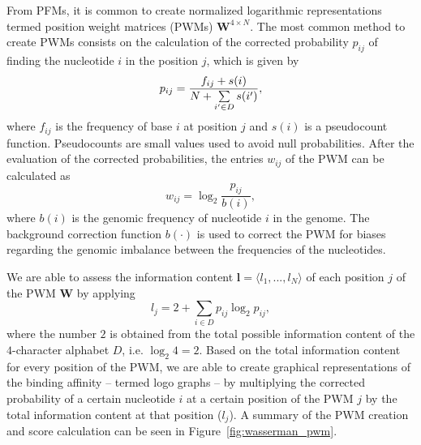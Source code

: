 From PFMs, it is common to create normalized logarithmic representations termed position weight matrices (PWMs) $\mathbf{W}^{4 \times N}$. The most common method to create PWMs consists on the calculation of the corrected probability $ p_{ij} $ of finding the nucleotide $ i $ in the position $ j $, which is given by
\begin{equation}
  \label{eq:pwm1}
  p_{ij} = \frac{ f_{ij} + s(i) }{ N + {\sum\limits _{i^\prime \in D}{ \hspace{-0.0cm} s(i^\prime)}} }, 
\end{equation}
where $ f_{ij} $ is the frequency of base $ i $ at position $ j $ and $ s(i) $ is a pseudocount function. Pseudocounts are small values used to avoid null probabilities. After the evaluation of the corrected probabilities, the entries $ w_{ij} $ of the PWM can be calculated as
\begin{equation}
  \label{eq:pwm2}
  w_{ij} = \log_2 \frac{ p_{ij} }{ b(i) }, 
\end{equation}
where $ b(i) $ is the genomic frequency of nucleotide $ i $ in the genome. The background correction function $b(\cdot)$ is used to correct the PWM for biases regarding the genomic imbalance between the frequencies of the nucleotides.

We are able to assess the information content $ \mathbf{l} = \langle{l}_{1}, ..., {l}_{N}\rangle $ of each position $ j $ of the PWM $ \mathbf{W} $ by applying
\begin{equation}
  \label{eq:pwm.ic}
  {l}_{j} = 2 + \sum\limits _{i \in D} p_{ij} \log_{2} p_{ij},
\end{equation}
where the number $2$ is obtained from the total possible information content of the $4$-character alphabet $D$, i.e. $\log_{2}4 = 2$. Based on the total information content for every position of the PWM, we are able to create graphical representations of the binding affinity -- termed logo graphs -- by multiplying the corrected probability of a certain nucleotide $i$ at a certain position of the PWM $j$ by the total information content at that position (${l}_{j}$). A summary of the PWM creation and score calculation can be seen in Figure~\ref{fig:wasserman_pwm}.

